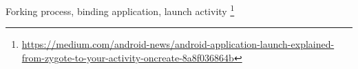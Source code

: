 Forking process, binding application, launch activity \footnote{\url{https://medium.com/android-news/android-application-launch-explained-from-zygote-to-your-activity-oncreate-8a8f036864b}}



% 









